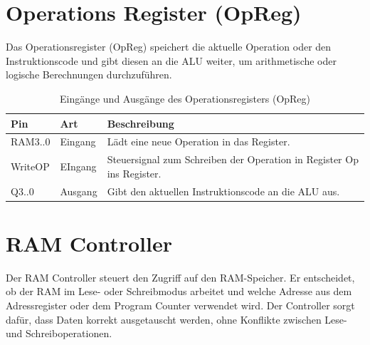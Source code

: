 \section{Operations Register (OpReg)}
\label{sec: operations-register}
Das Operationsregister (OpReg) speichert die aktuelle Operation oder den Instruktionscode und gibt diesen
an die ALU weiter, um arithmetische oder logische Berechnungen durchzuführen.

\begin{table}[H]
  \centering
  \begin{tabular}{|l|l|p{8cm}|} \hline \textbf{Pin} & \textbf{Art} & \textbf{Beschreibung}                                                 \\ \hline
               RAM3..0                            & Eingang      & Lädt eine neue Operation in das Register.                             \\ \hline
               WriteOP                            & EIngang      & Steuersignal zum Schreiben der Operation in Register Op ins Register. \\ \hline
               Q3..0                              & Ausgang      & Gibt den aktuellen Instruktionscode an die ALU aus.                   \\ \hline
  \end{tabular}
  \caption{Eingänge und Ausgänge des Operationsregisters (OpReg)}
\end{table}


\section{RAM Controller}
\label{sec:ram}

Der RAM Controller steuert den Zugriff auf den RAM-Speicher. Er entscheidet, ob der RAM im Lese- oder Schreibmodus
arbeitet und welche Adresse aus dem Adressregister oder dem Program Counter verwendet wird. Der Controller
sorgt dafür, dass Daten korrekt ausgetauscht werden, ohne Konflikte zwischen Lese- und Schreiboperationen.

